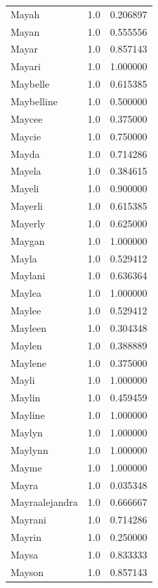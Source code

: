 \documentclass[
  letterpaper,
  DIV=11,
  numbers=noendperiod]{scrreprt}
\begin{document}
\begin{tabular}{lrr}
Mayah           &   1.0 &   0.206897 \\
Mayan           &   1.0 &   0.555556 \\
Mayar           &   1.0 &   0.857143 \\
Mayari          &   1.0 &   1.000000 \\
Maybelle        &   1.0 &   0.615385 \\
Maybelline      &   1.0 &   0.500000 \\
Maycee          &   1.0 &   0.375000 \\
Maycie          &   1.0 &   0.750000 \\
Mayda           &   1.0 &   0.714286 \\
Mayela          &   1.0 &   0.384615 \\
Mayeli          &   1.0 &   0.900000 \\
Mayerli         &   1.0 &   0.615385 \\
Mayerly         &   1.0 &   0.625000 \\
Maygan          &   1.0 &   1.000000 \\
Mayla           &   1.0 &   0.529412 \\
Maylani         &   1.0 &   0.636364 \\
Maylea          &   1.0 &   1.000000 \\
Maylee          &   1.0 &   0.529412 \\
Mayleen         &   1.0 &   0.304348 \\
Maylen          &   1.0 &   0.388889 \\
Maylene         &   1.0 &   0.375000 \\
Mayli           &   1.0 &   1.000000 \\
Maylin          &   1.0 &   0.459459 \\
Mayline         &   1.0 &   1.000000 \\
Maylyn          &   1.0 &   1.000000 \\
Maylynn         &   1.0 &   1.000000 \\
Mayme           &   1.0 &   1.000000 \\
Mayra           &   1.0 &   0.035348 \\
Mayraalejandra  &   1.0 &   0.666667 \\
Mayrani         &   1.0 &   0.714286 \\
Mayrin          &   1.0 &   0.250000 \\
Maysa           &   1.0 &   0.833333 \\
Mayson          &   1.0 &   0.857143 \\

\end{tabular}
\end{document}
